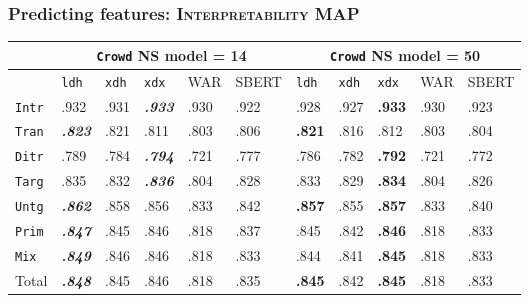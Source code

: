 \documentclass[handout,xcolor={dvipsnames}]{beamer}
\newcommand{\feat}[1]{\textsc{#1}}
\newcommand{\param}[1]{\texttt{#1}}
\begin{document}
\begin{frame}
\frametitle{Predicting features: \feat{Interpretability} MAP}

\small

\begin{table}[htb!]
\begin{center}
\setlength{\tabcolsep}{.35em}
\begin{tabular}{|l||l|l|l||l|l||l|l|l||l|l|}
\hline
 & \multicolumn{5}{c||}{\param{Crowd} NS model = 14} & \multicolumn{5}{c|}{\param{Crowd} NS model = 50} \\
\hline
    		& \param{ldh}	& \param{xdh} &	\param{xdx} & WAR	& {\scriptsize SBERT} & \param{ldh}	& \param{xdh} &	\param{xdx} & WAR	& {\scriptsize SBERT} \\ \hline
\hline
\param{Intr}  & .932                   & .931 & \textit{\textbf{.933}} & .930 & .922 & .928          & .927 & \textbf{.933} & .930 & .923 \\
\hline
\param{Tran}  & \textit{\textbf{.823}} & .821 & .811                   & .803 & .806 & \textbf{.821} & .816 & .812                   & .803 & .804 \\
\hline
\param{Ditr}  & .789                   & .784 & \textit{\textbf{.794}} & .721 & .777 & .786          & .782 & 
\textbf{.792}          & .721 & .772 \\
\hline
\hline
\param{Targ}  & .835                   & .832 & \textit{\textbf{.836}} & .804 & .828 & .833          & .829 & \textbf{.834}          & .804 & .826 \\
\hline
\param{Untg}  & \textit{\textbf{.862}} & .858 & .856                   & .833 & .842 & \textbf{.857} & .855 & \textbf{.857}          & .833 & .840 \\
\hline
\hline
\param{Prim}  & \textit{\textbf{.847}} & .845 & .846                   & .818 & .837 & .845          & .842 & \textbf{.846}          & .818 & .833 \\
\hline
\param{Mix}   & \textit{\textbf{.849}} & .846 & .846                   & .818 & .833 & .844          & .841 & \textbf{.845}          & .818 & .833 \\
\hline
\hline
Total & \textit{\textbf{.848}} & .845 & .846                   & .818 & .835 & \textbf{.845} & .842 & \textbf{.845}          & .818 & .833 \\
\hline
\end{tabular}
\end{center}
\end{table}



\end{frame}
\end{document}
